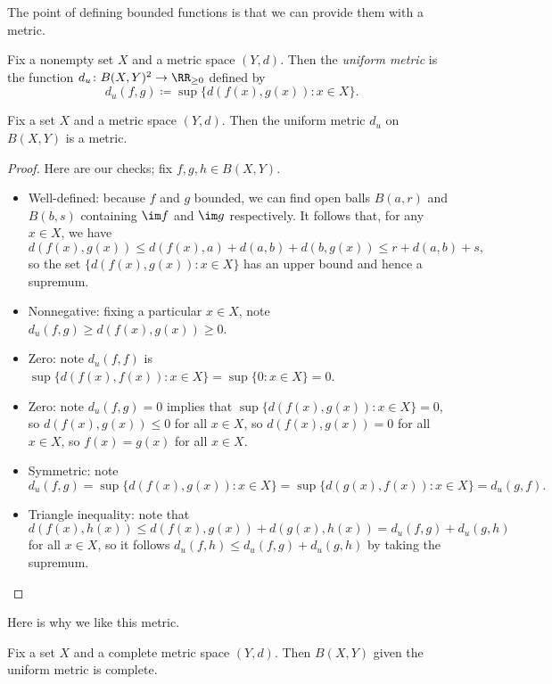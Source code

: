 \documentclass[../notes.tex]{subfiles}
\begin{document}
The point of defining bounded functions is that we can provide them with a metric.
\begin{definition}
	Fix a nonempty set $X$ and a metric space $(Y,d)$. Then the \textit{uniform metric} is the function $d_u\colon B(X,Y)^2\to\RR_{\ge0}$ defined by
	\[d_u(f,g)\coloneqq\sup\{d(f(x),g(x)):x\in X\}.\]
\end{definition}
\begin{lemma}
	Fix a set $X$ and a metric space $(Y,d)$. Then the uniform metric $d_u$ on $B(X,Y)$ is a metric.
\end{lemma}
\begin{proof}
	Here are our checks; fix $f,g,h\in B(X,Y)$.
	\begin{itemize}
		\item Well-defined: because $f$ and $g$ bounded, we can find open balls $B(a,r)$ and $B(b,s)$ containing $\im f$ and $\im g$ respectively. It follows that, for any $x\in X$, we have
		\[d(f(x),g(x))\le d(f(x),a)+d(a,b)+d(b,g(x))\le r+d(a,b)+s,\]
		so the set $\{d(f(x),g(x)):x\in X\}$ has an upper bound and hence a supremum.
		\item Nonnegative: fixing a particular $x\in X$, note $d_u(f,g)\ge d(f(x),g(x))\ge0$.
		\item Zero: note $d_u(f,f)$ is $\sup\{d(f(x),f(x)):x\in X\}=\sup\{0:x\in X\}=0$.
		\item Zero: note $d_u(f,g)=0$ implies that $\sup\{d(f(x),g(x)):x\in X\}=0$, so $d(f(x),g(x))\le0$ for all $x\in X$, so $d(f(x),g(x))=0$ for all $x\in X$, so $f(x)=g(x)$ for all $x\in X$.
		\item Symmetric: note
		\[d_u(f,g)=\sup\{d(f(x),g(x)):x\in X\}=\sup\{d(g(x),f(x)):x\in X\}=d_u(g,f).\]
		\item Triangle inequality: note that
		\[d(f(x),h(x))\le d(f(x),g(x))+d(g(x),h(x))=d_u(f,g)+d_u(g,h)\]
		for all $x\in X$, so it follows $d_u(f,h)\le d_u(f,g)+d_u(g,h)$ by taking the supremum.
		\qedhere
	\end{itemize}
\end{proof}
Here is why we like this metric.
\begin{proposition} \label{prop:completeboundedfuncs}
	Fix a set $X$ and a complete metric space $(Y,d)$. Then $B(X,Y)$ given the uniform metric is complete.
\end{proposition}
\end{document}
